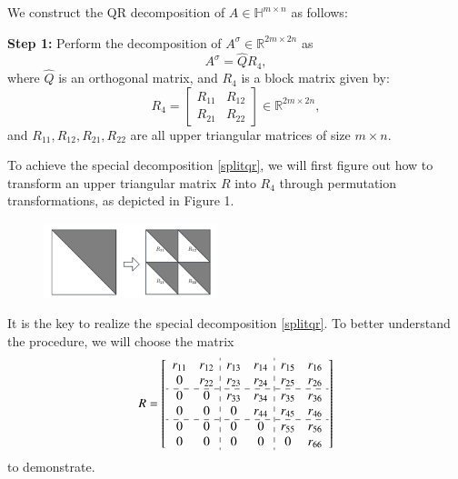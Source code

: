 \documentclass[5p,10pt]{elsarticle}
\numberwithin{equation}{section}
\begin{document}
We construct the QR decomposition of $A \in \mathbb{H}^{m \times n}$ as follows:

\textbf{Step 1:} Perform the decomposition of $A^\sigma \in \mathbb{R}^{2m \times 2n}$ as \begin{equation}\label{splitqr}A^\sigma = \hat{Q} R_4,\end{equation} where $\hat{Q}$ is an orthogonal matrix, and $R_4$ is a block matrix given by:
\begin{equation}\label{r4}
R_4 = \begin{bmatrix}
    R_{11} & R_{12} \\
    R_{21} & R_{22}
\end{bmatrix} \in \mathbb{R}^{2m \times 2n},
\end{equation}
and $R_{11}, R_{12},R_{21},R_{22}$ are all upper triangular matrices of size $m \times n$.

To achieve the special decomposition \eqref{splitqr},  we will first figure out how to transform an upper triangular matrix $R$ into $R_4$ through permutation transformations, as depicted in Figure 1.
\begin{figure}[htbp]
        \centering
        \includegraphics[width=0.45\textwidth,keepaspectratio=true]{Upper triangular.png} %
         \label{fig:Upper triangular}
\end{figure}

 It is the key to realize the special decomposition \eqref{splitqr}. To better understand the procedure, we will choose the matrix 
\[R= \begin{bmatrix}
\begin{array}{cc:cc:cc}
 r_{11} & r_{12} & r_{13} & r_{14} & r_{15} & r_{16}\\
 0 & r_{22} & r_{23} & r_{24} & r_{25} & r_{26}\\
 \cdashline{1-6}
 0      & 0      & r_{33} & r_{34} & r_{35} & r_{36}\\
 0      & 0      & 0 & r_{44} & r_{45} & r_{46}\\
 \cdashline{1-6}
 0      & 0      & 0      & 0      & r_{55} & r_{56}\\
 0      & 0      & 0      & 0      & 0 & r_{66}\\
\end{array}
\end{bmatrix}
\]
to demonstrate. 
\end{document}
